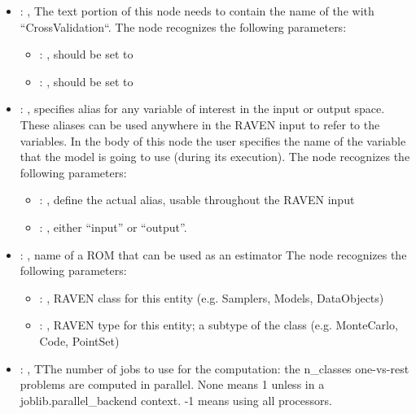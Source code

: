\begin{itemize}
    \item {}: , 
      The text portion of this node needs to contain the name of the  with
               ``CrossValidation``.
      The  node recognizes the following parameters:
        \begin{itemize}
          \item {}: , 
            should be set to 
          \item {}: , 
            should be set to 
      \end{itemize}

    \item {}: , 
      specifies alias for         any variable of interest in the input or output space. These
      aliases can be used anywhere in the RAVEN input to         refer to the variables. In the body
      of this node the user specifies the name of the variable that the model is going to use
      (during its execution).
      The  node recognizes the following parameters:
        \begin{itemize}
          \item {}: , 
            define the actual alias, usable throughout the RAVEN input
          \item {}: , 
            either ``input'' or ``output''.
      \end{itemize}

    \item {}: , 
      name of a ROM that can be used as an estimator
      The  node recognizes the following parameters:
        \begin{itemize}
          \item {}: , 
            RAVEN class for this entity (e.g. Samplers, Models, DataObjects)
          \item {}: , 
            RAVEN type for this entity; a subtype of the class (e.g. MonteCarlo, Code, PointSet)
      \end{itemize}

    \item {}: , 
      TThe number of jobs to use for the computation: the n\_classes one-vs-rest
      problems are computed in parallel. None means 1 unless in a joblib.parallel\_backend
      context. -1 means using all processors.
  \end{itemize}


